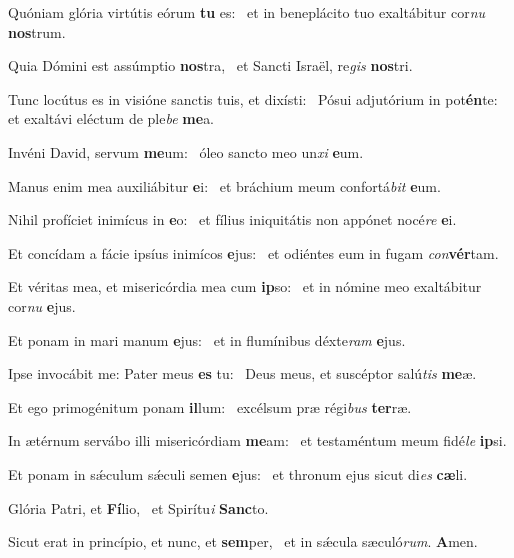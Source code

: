 \item Quóniam glória virtútis eórum \textbf{tu} es:~\psstar{} et in beneplácito tuo exaltábitur cor\textit{nu} \textbf{nos}trum.
\item Quia Dómini est assúmptio \textbf{nos}tra,~\psstar{} et Sancti Israël, re\textit{gis} \textbf{nos}tri.
\item Tunc locútus es in visióne sanctis tuis, et dixísti:~\pscross{} Pósui adjutórium in pot\textbf{én}te:~\psstar{} et exaltávi eléctum de ple\textit{be} \textbf{me}a.
\item Invéni David, servum \textbf{me}um:~\psstar{} óleo sancto meo un\textit{xi} \textbf{e}um.
\item Manus enim mea auxiliábitur \textbf{e}i:~\psstar{} et bráchium meum confortá\textit{bit} \textbf{e}um.
\item Nihil profíciet inimícus in \textbf{e}o:~\psstar{} et fílius iniquitátis non appónet nocé\textit{re} \textbf{e}i.
\item Et concídam a fácie ipsíus inimícos \textbf{e}jus:~\psstar{} et odiéntes eum in fugam \textit{con}\textbf{vér}tam.
\item Et véritas mea, et misericórdia mea cum \textbf{ip}so:~\psstar{} et in nómine meo exaltábitur cor\textit{nu} \textbf{e}jus.
\item Et ponam in mari manum \textbf{e}jus:~\psstar{} et in flumínibus déxte\textit{ram} \textbf{e}jus.
\item Ipse invocábit me: Pater meus \textbf{es} tu:~\psstar{} Deus meus, et suscéptor salú\textit{tis} \textbf{me}æ.
\item Et ego primogénitum ponam \textbf{il}lum:~\psstar{} excélsum præ régi\textit{bus} \textbf{ter}ræ.
\item In ætérnum servábo illi misericórdiam \textbf{me}am:~\psstar{} et testaméntum meum fidé\textit{le} \textbf{ip}si.
\item Et ponam in sǽculum sǽculi semen \textbf{e}jus:~\psstar{} et thronum ejus sicut di\textit{es} \textbf{cæ}li.
\item Glória Patri, et \textbf{Fí}lio,~\psstar{} et Spirítu\textit{i} \textbf{Sanc}to.
\item Sicut erat in princípio, et nunc, et \textbf{sem}per,~\psstar{} et in sǽcula sæculó\textit{rum}. \textbf{A}men.
